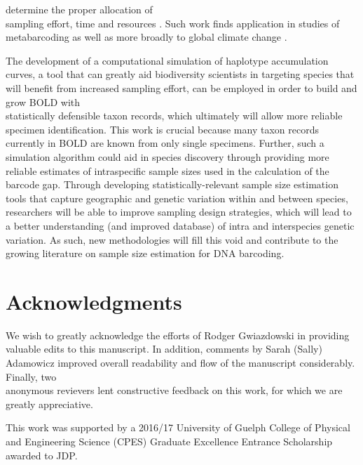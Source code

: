 determine the proper allocation of \\ sampling effort, time and resources \cite{hortal2005ed}. Such work finds application in studies of \\ metabarcoding \cite{wares2015can} as well as more broadly to global climate change \cite{pfenninger2012methodological}.



The development of a computational simulation of haplotype accumulation curves, a tool that can greatly aid biodiversity scientists in targeting species that will benefit from increased sampling effort, can be employed in order to build and grow BOLD with \\ statistically defensible taxon records, which ultimately will allow more reliable specimen identification. This work is crucial because many taxon records currently in BOLD are known from only single specimens. Further, such a simulation algorithm could aid in species discovery through providing more reliable estimates of intraspecific sample sizes used in the calculation of the barcode gap. Through developing statistically-relevant sample size estimation tools that capture geographic and genetic variation within and between species, researchers will be able to improve sampling design strategies, which will lead to a better understanding (and improved database) of intra and interspecies genetic variation. As such, new methodologies will fill this void and contribute to the growing literature on sample size estimation for DNA barcoding.

\newpage

\section*{Acknowledgments}

We wish to greatly acknowledge the efforts of Rodger Gwiazdowski in providing \\ valuable edits to this manuscript. In addition, comments by Sarah (Sally) Adamowicz improved overall readability and flow of the manuscript considerably. Finally, two \\ anonymous revievers lent constructive feedback on this work, for which we are greatly appreciative.



This work was supported by a 2016/17 University of Guelph College of Physical and Engineering Science (CPES) Graduate Excellence Entrance Scholarship awarded to JDP.



